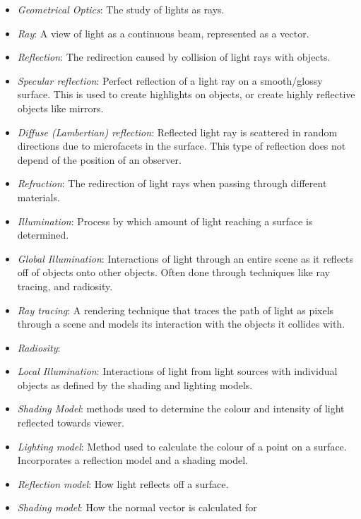 \documentclass[12pt]{article}
\begin{document}
\begin{itemize}
\item[\label{}] \textit{Geometrical Optics}: The study of lights as rays.
\item[\label{}] \textit{Ray}: A view of light as a continuous beam, represented 
as a 
vector.
\item[\label{}] \textit{Reflection}: The redirection caused by collision of 
light rays 
with objects.
\item[\label{}] \textit{Specular reflection}: Perfect reflection of a light ray 
on a smooth/glossy surface. This is used to create highlights on objects, or 
create highly reflective objects like mirrors.
\item[\label{}] \textit{Diffuse (Lambertian) reflection}: Reflected light ray 
is scattered in random directions due to microfacets in the surface. This type 
of reflection does not depend of the position of an observer.
\item[\label{}] \textit{Refraction}: The redirection of light rays when passing 
through 
different materials.
\item[\label{}] \textit{Illumination}: Process by which amount of light 
reaching a 
surface is determined.
\item[\label{}] \textit{Global Illumination}: Interactions of light through an 
entire scene as it reflects off of objects onto other objects. Often done 
through techniques like ray tracing, and radiosity.
\item[\label{}] \textit{Ray tracing}: A rendering technique that traces the 
path of light as pixels through a scene and models its interaction with the 
objects it collides with.
\item[\label{}] \textit{Radiosity}: 
\item[\label{}] \textit{Local Illumination}: Interactions of light from light 
sources with individual objects as defined by the shading and lighting models.
\item[\label{}] \textit{Shading Model}: methods used to determine the colour 
and intensity of light reflected towards viewer. 
\item[\label{}]\textit{Lighting model}: Method used to calculate the colour of 
a point on a surface. Incorporates a reflection model and a shading model. 
\item[\label{}] \textit{Reflection model}: How light reflects off a surface. 
\item[\label{}] \textit{Shading model}: How the normal vector is calculated for 

\end{itemize}
\end{document}
